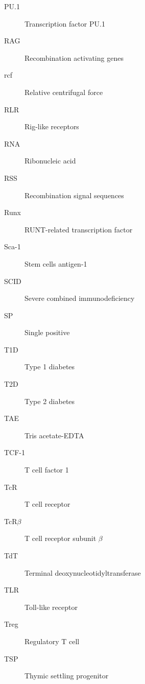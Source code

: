 \begin{description}
\item[PU.1]
Transcription factor PU.1

\item[RAG]
Recombination activating genes

\item[rcf]
Relative centrifugal force

\item[RLR]
Rig-like receptors

\item[RNA]
Ribonucleic acid

\item[RSS]
Recombination signal sequences

\item[Runx]
RUNT-related transcription factor

\item[Sca-1]
Stem cells antigen-1

\item[SCID]
Severe combined immunodeficiency

\item[SP]
Single positive

\item[T1D]
Type 1 diabetes

\item[T2D]
Type 2 diabetes

\item[TAE]
Tris acetate-EDTA

\item[TCF-1]
T cell factor 1

\item[TcR]
T cell receptor

\item[TcR$\beta$]
T cell receptor subunit $\beta$

\item[TdT]
Terminal deoxynucleotidyltransferase

\item[TLR]
Toll-like receptor

\item[Treg]
Regulatory T cell

\item[TSP]
Thymic settling progenitor

\end{description}